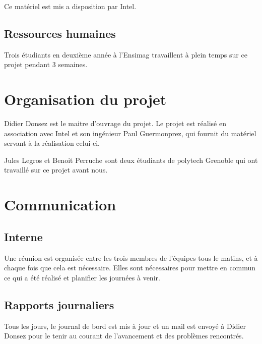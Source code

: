 \documentclass[a4paper,12pt]{article}
\begin{document}
Ce matériel est mis a disposition par Intel.

\subsection{Ressources humaines}

Trois étudiants en deuxième année à l'Ensimag travaillent à plein temps sur ce
projet pendant 3 semaines.










\section{Organisation du projet}

Didier Donsez est le maitre d'ouvrage du projet.
Le projet est réalisé en association avec Intel et son ingénieur Paul Guermonprez, qui
fournit du matériel servant à la réalisation celui-ci.

Jules Legros et Benoit Perruche sont deux étudiants de polytech Grenoble qui
ont travaillé sur ce projet avant nous.







\section{Communication}

\subsection{Interne}

Une réunion est organisée entre les trois membres de l'équipes tous le matins,
et à chaque fois que cela est nécessaire. Elles sont nécessaires pour mettre en
commun ce qui a été réalisé et planifier les journées à venir.

\subsection{Rapports journaliers}

Tous les jours, le journal de bord est mis à jour et un mail est envoyé à
Didier Donsez pour le tenir au courant de l'avancement et des problèmes
rencontrés.
\end{document}
